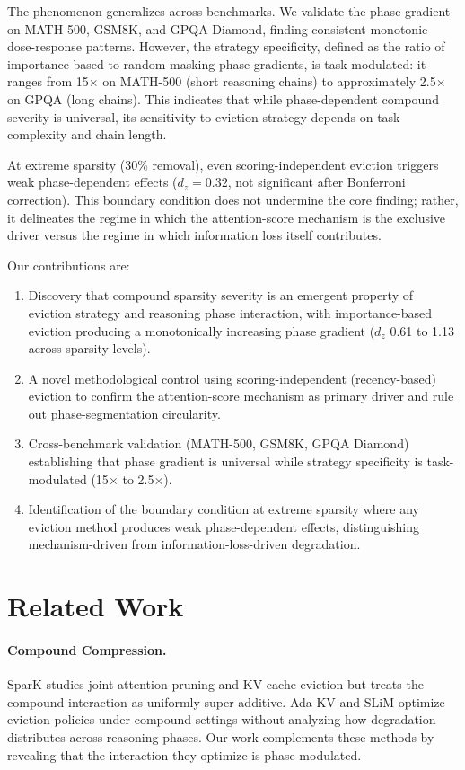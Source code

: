 \documentclass[11pt,a4paper]{article}
\begin{document}
The phenomenon generalizes across benchmarks. We validate the phase gradient on MATH-500, GSM8K, and GPQA Diamond, finding consistent monotonic dose-response patterns. However, the strategy specificity, defined as the ratio of importance-based to random-masking phase gradients, is task-modulated: it ranges from 15$\times$ on MATH-500 (short reasoning chains) to approximately 2.5$\times$ on GPQA (long chains). This indicates that while phase-dependent compound severity is universal, its sensitivity to eviction strategy depends on task complexity and chain length.

At extreme sparsity (30\% removal), even scoring-independent eviction triggers weak phase-dependent effects ($d_z=0.32$, not significant after Bonferroni correction). This boundary condition does not undermine the core finding; rather, it delineates the regime in which the attention-score mechanism is the exclusive driver versus the regime in which information loss itself contributes.

Our contributions are:
\begin{enumerate}
    \item Discovery that compound sparsity severity is an emergent property of eviction strategy and reasoning phase interaction, with importance-based eviction producing a monotonically increasing phase gradient ($d_z$ 0.61 to 1.13 across sparsity levels).
    \item A novel methodological control using scoring-independent (recency-based) eviction to confirm the attention-score mechanism as primary driver and rule out phase-segmentation circularity.
    \item Cross-benchmark validation (MATH-500, GSM8K, GPQA Diamond) establishing that phase gradient is universal while strategy specificity is task-modulated (15$\times$ to 2.5$\times$).
    \item Identification of the boundary condition at extreme sparsity where any eviction method produces weak phase-dependent effects, distinguishing mechanism-driven from information-loss-driven degradation.
\end{enumerate}

\section{Related Work}

\paragraph{Compound Compression.} SparK studies joint attention pruning and KV cache eviction but treats the compound interaction as uniformly super-additive. Ada-KV and SLiM optimize eviction policies under compound settings without analyzing how degradation distributes across reasoning phases. Our work complements these methods by revealing that the interaction they optimize is phase-modulated.
\end{document}
